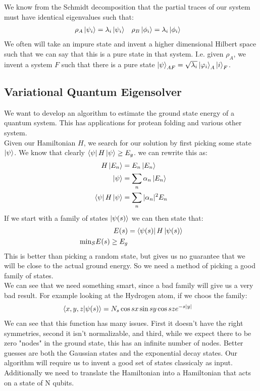We know from the Schmidt decomposition that the partial traces of our system must have identical eigenvalues such that:
\begin{align*}
	\rho_A \ket{\psi_i} &= \lambda_i \ket{\psi_i} &
	\rho_B \ket{\phi_i} &= \lambda_i \ket{\phi_i}
\end{align*}
We often will take an impure state and invent a higher dimensional Hilbert space such that we can say that this is a pure state in that system. 
I.e. given $\rho_A$, we invent a system $F$ such that there is a pure state $\ket{\psi}_{AF} = \sqrt{\lambda_i}\ket{\varphi_i}_A\ket{i}_F$.
\subsection{Variational Quantum Eigensolver}
We want to develop an algorithm to estimate the ground state energy of a quantum system. This has applications for protean folding and various other system. \\
Given our Hamiltonian $H$, we search for our solution by first picking some state $\ket{\psi}$. We know that clearly $\bra{\psi}H\ket{\psi} \geq E_g$. we can rewrite this as:
\begin{align*}
	H\ket{E_n} &= E_n\ket{E_n} \\
	\ket{\psi} &= \sum_n \alpha_n \ket{E_n} \\
	\bra{\psi}H\ket{\psi} &= \sum_n |\alpha_n|^2 E_n
\end{align*}
If we start with a family of states $\ket{\psi(s)}$ we can then state that:
\begin{align*}
	E(s) &= \bra{\psi(s)}H\ket{\psi(s)} \\
	\text{min}_S E(s) \geq E_g
\end{align*}
This is better than picking a random state, but gives us no guarantee that we will be close to the actual ground energy. So we need a method of picking a good family of states. \\
We can see that we need something smart, since a bad family will give us a very bad result. For example looking at the Hydrogen atom, if we choos the family:
\begin{align*}
	\bra{x,y,z}\ket{\psi(s)} &= N_s \cos sx \sin sy \cos sz e^{-s|y|}
\end{align*}
We can see that this function has many issues. First it doesn't have the right symmetries, second it isn't normalizable, and third, while we expect there to be zero "nodes" in the ground state, this has an infinite number of nodes. 
Better guesses are both the Gaussian states and the exponential decay states. Our algorithm will require us to invent a good set of states classicaly as input. Additionally we need to translate the Hamiltonian into a Hamiltonian that acts on a state of N qubits.\\
